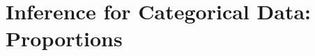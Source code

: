 \documentclass[../stats.tex]{subfiles}
\begin{document}
\chapter{Inference for Categorical Data: Proportions}
\end{document}
